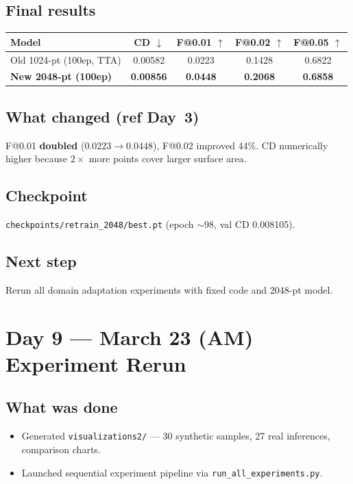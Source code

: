 \documentclass[10pt,a4paper]{article}
\begin{document}
\subsection*{Final results}
\begin{center}
\begin{tabular}{lcccc}
\toprule
\textbf{Model} & \textbf{CD $\downarrow$} & \textbf{F@0.01 $\uparrow$} & \textbf{F@0.02 $\uparrow$} & \textbf{F@0.05 $\uparrow$} \\
\midrule
Old 1024-pt (100ep, TTA) & 0.00582 & 0.0223 & 0.1428 & 0.6822 \\
\textbf{New 2048-pt (100ep)} & \textbf{0.00856} & \textbf{0.0448} & \textbf{0.2068} & \textbf{0.6858} \\
\bottomrule
\end{tabular}
\end{center}

\subsection*{What changed (ref Day~3)}
F@0.01 \textbf{doubled} ($0.0223 \to 0.0448$), F@0.02 improved 44\%. CD numerically higher because $2\times$ more points cover larger surface area.

\subsection*{Checkpoint}
\texttt{checkpoints/retrain\_2048/best.pt} (epoch $\sim$98, val CD 0.008105).

\subsection*{Next step}
Rerun all domain adaptation experiments with fixed code and 2048-pt model.

\section*{Day 9 --- March 23 (AM) \hfill \normalfont\small Experiment Rerun}

\subsection*{What was done}
\begin{itemize}[nosep]
    \item Generated \texttt{visualizations2/} --- 30 synthetic samples, 27 real inferences, comparison charts.
    \item Launched sequential experiment pipeline via \texttt{run\_all\_experiments.py}.
\end{itemize}
\end{document}
